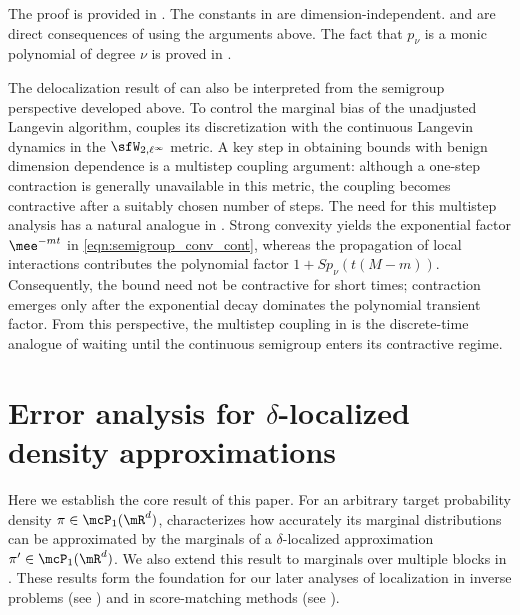 \documentclass[11pt]{article}
\begin{document}
The proof is provided in .
The constants in  are dimension-independent.  and  are direct consequences of  using the arguments above.
The fact that $p_\nu$ is a monic polynomial of degree $\nu$ is proved in .



\begin{rem}
The delocalization result of \cite{chen2026convergence} can also be interpreted from the semigroup perspective developed above.
To control the marginal bias of the unadjusted Langevin algorithm, \cite{chen2026convergence} couples its discretization with the continuous Langevin dynamics in the $\sfW_{2,\ell^\infty}$ metric.
A key step in obtaining bounds with benign dimension dependence is a multistep coupling argument: although a one-step contraction is generally unavailable in this metric, the coupling becomes contractive after a suitably chosen number of steps.
The need for this multistep analysis has a natural analogue in .
Strong convexity yields the exponential factor $\mee^{-mt}$ in \eqref{eqn:semigroup_conv_cont}, whereas the propagation of local interactions contributes the polynomial factor $1+S p_\nu(t(M-m))$.
Consequently, the bound need not be contractive for short times; contraction emerges only after the exponential decay dominates the polynomial transient factor.
From this perspective, the multistep coupling in \cite{chen2026convergence} is the discrete-time analogue of waiting until the continuous semigroup enters its contractive regime.
\end{rem}








\section{Error analysis for \texorpdfstring{$\delta$}{delta}-localized density approximations}
\label{sec:MarginTala}


Here we establish the core result of this paper.
%
For an arbitrary target probability density $\pi \in \mcP_{1}(\mR^d)$,  characterizes how accurately its marginal distributions can be approximated by the marginals of a $\delta$-localized approximation $\pi' \in \mcP_{1}(\mR^d)$.
We also extend this result to marginals over multiple blocks in .
%
These results form the foundation for our later analyses of localization in inverse problems (see ) and in score-matching methods (see ).
\end{document}
